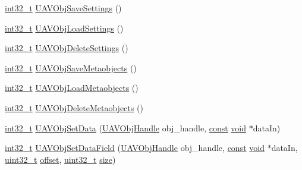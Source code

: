 \begin{DoxyCompactItemize}
\item 
\hyperlink{group___n_a_m_e_gafd12020da5a235dfcf0c3c748fb5baed}{int32\-\_\-t} \hyperlink{group___u_a_v_ga6282540dd888720334943f3b3ad5f301}{U\-A\-V\-Obj\-Save\-Settings} ()
\item 
\hyperlink{group___n_a_m_e_gafd12020da5a235dfcf0c3c748fb5baed}{int32\-\_\-t} \hyperlink{group___u_a_v_ga961f3df74e4106ee108a10b57536302f}{U\-A\-V\-Obj\-Load\-Settings} ()
\item 
\hyperlink{group___n_a_m_e_gafd12020da5a235dfcf0c3c748fb5baed}{int32\-\_\-t} \hyperlink{group___u_a_v_ga5f40e35848fe223463778b90e8035cbd}{U\-A\-V\-Obj\-Delete\-Settings} ()
\item 
\hyperlink{group___n_a_m_e_gafd12020da5a235dfcf0c3c748fb5baed}{int32\-\_\-t} \hyperlink{group___u_a_v_ga203ebba7c25227245b1ae5abd38492c4}{U\-A\-V\-Obj\-Save\-Metaobjects} ()
\item 
\hyperlink{group___n_a_m_e_gafd12020da5a235dfcf0c3c748fb5baed}{int32\-\_\-t} \hyperlink{group___u_a_v_ga014c904f7cc34d6bb5a5a1f23ebe3364}{U\-A\-V\-Obj\-Load\-Metaobjects} ()
\item 
\hyperlink{group___n_a_m_e_gafd12020da5a235dfcf0c3c748fb5baed}{int32\-\_\-t} \hyperlink{group___u_a_v_ga74aba825a99924f3c8e3f7c209409ab6}{U\-A\-V\-Obj\-Delete\-Metaobjects} ()
\item 
\hyperlink{group___n_a_m_e_gafd12020da5a235dfcf0c3c748fb5baed}{int32\-\_\-t} \hyperlink{group___u_a_v_gaca346cc577b81ba51cde8f793cdaf969}{U\-A\-V\-Obj\-Set\-Data} (\hyperlink{group___n_a_m_e_gac31715ab50a1903838e7d87c8022ec75}{U\-A\-V\-Obj\-Handle} obj\-\_\-handle, \hyperlink{group___n_a_m_e_ga7ae6d0e43244213b34de2c2b9aa30da6}{const} \hyperlink{group___n_a_m_e_ga18028b8badbf1ea7e704ccac3c488e82}{void} $\ast$data\-In)
\item 
\hyperlink{group___n_a_m_e_gafd12020da5a235dfcf0c3c748fb5baed}{int32\-\_\-t} \hyperlink{group___u_a_v_gab4d774a4a829bc754878021d3bcb195f}{U\-A\-V\-Obj\-Set\-Data\-Field} (\hyperlink{group___n_a_m_e_gac31715ab50a1903838e7d87c8022ec75}{U\-A\-V\-Obj\-Handle} obj\-\_\-handle, \hyperlink{group___n_a_m_e_ga7ae6d0e43244213b34de2c2b9aa30da6}{const} \hyperlink{group___n_a_m_e_ga18028b8badbf1ea7e704ccac3c488e82}{void} $\ast$data\-In, \hyperlink{stdint_8h_a435d1572bf3f880d55459d9805097f62}{uint32\-\_\-t} \hyperlink{group___copter_control_b_l_gaa9fff43968831437a312428836cab362}{offset}, \hyperlink{stdint_8h_a435d1572bf3f880d55459d9805097f62}{uint32\-\_\-t} \hyperlink{pios__opahrs__proto_8h_ae5dc6ffcd9b7605c7787791e40cc6bb0}{size})
\item 

\end{DoxyCompactItemize}
